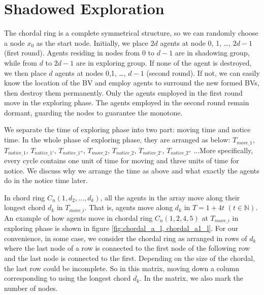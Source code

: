 \section{Shadowed Exploration}
The chordal ring is a complete symmetrical structure, so we can randomly choose a node $x_0$ as the start node. Initially, we place $2d$ agents at node 0, 1, \ldots , $2d-1$ (first round). Agents residing in nodes from $0$ to $d-1$ are in shadowing group, while from $d$ to $2d-1$ are in exploring group. If none of the agent is destroyed, we then place $d$ agents at nodes 0,1, \ldots, $d-1$ (second round). If not, we can easily know the location of the BV and employ agents to surround the new formed BVs, then destroy them permanently. Only the agents employed in the first round move in the exploring phase. The agents employed in the second round remain dormant, guarding the nodes to guarantee the monotone. 

We separate the time of exploring phase into two part: moving time and notice time. In the whole phase of exploring phase, they are arranged as below: $T_{move\_1}$, $T_{notice\_1}$, $T_{notice\_1'}$, $T_{notice\_1''}$, $T_{move\_2}$, $T_{notice\_2}$, $T_{notice\_2'}$, $T_{notice\_2''}$ ...More specifically, every cycle contains one unit of time for moving and three units of time for notice. We discuss why we arrange the time as above and what exactly the agents do in the notice time later. 

In chord ring $C_n(1, d_2, \ldots, d_k)$, all the agents in the array move along their longest chord $d_k$ in $T_{move\_i}$. That is, agents move along $d_k$ in $T=1+4t$ $(t\in \mathbb{N})$.  An example of how agents move in chordal ring $C_n(1, 2 , 4, 5)$ at $T_{move\_i}$ in exploring phase is shown in figure \ref{fig:chordal_a_l, chordal_a1_l}. For our convenience, in some case, we consider the chordal ring as arranged in rows of $d_k$ where the last node of a row is connected to the first node of the following row and the last node is connected to the first. Depending on the size of the chordal, the last row could be incomplete. So in this matrix, moving down a column corresponding to using the longest chord $d_k$. In the matrix, we also mark the number of nodes.

